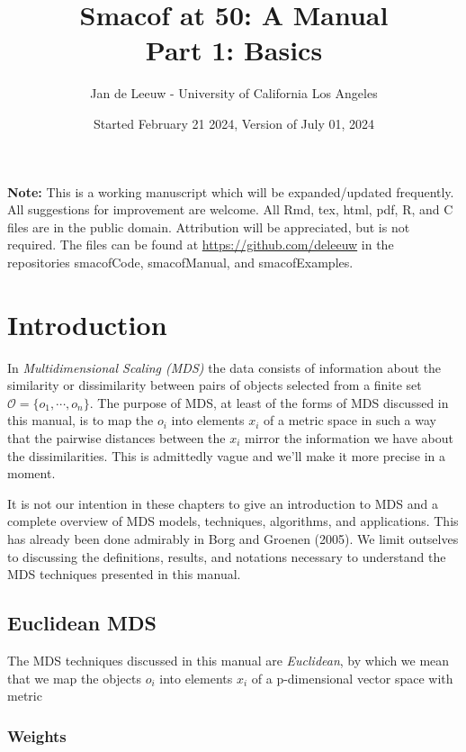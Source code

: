 \documentclass[
  12pt,
]{article}
\title{Smacof at 50: A Manual\\
Part 1: Basics}
\author{Jan de Leeuw - University of California Los Angeles}
\date{Started February 21 2024, Version of July 01, 2024}
\newcommand{\sectionbreak}{\clearpage}
\begin{document}
\maketitle

{
\setcounter{tocdepth}{4}
\tableofcontents
}
\textbf{Note:} This is a working manuscript which will be expanded/updated
frequently. All suggestions for improvement are welcome. All Rmd, tex,
html, pdf, R, and C files are in the public domain. Attribution will be
appreciated, but is not required. The files can be found at
\url{https://github.com/deleeuw} in the repositories smacofCode, smacofManual,
and smacofExamples.

\sectionbreak

\section{Introduction}\label{introduction}

In \emph{Multidimensional Scaling (MDS)} the data consists of information
about the similarity or dissimilarity between pairs of objects selected
from a finite set \(\mathcal{O}=\{o_1,\cdots,o_n\}\). The purpose of MDS,
at least of the forms of MDS discussed in this manual, is to map
the \(o_i\) into elements \(x_i\) of a metric space in such a way that
the pairwise distances between the \(x_i\) mirror the information we have about the dissimilarities. This is admittedly vague and we'll make it more
precise in a moment.

It is not our intention in these chapters to give an introduction to MDS
and a complete overview of MDS models, techniques, algorithms, and
applications. This has already been done admirably in
Borg and Groenen (2005). We limit outselves to discussing the definitions, results, and notations necessary to understand the MDS techniques presented in this manual.

\subsection{Euclidean MDS}\label{euclidean-mds}

The MDS techniques discussed in this manual are \emph{Euclidean}, by which we mean that we map the objects \(o_i\) into elements \(x_i\) of a p-dimensional vector space with metric

\subsubsection{Weights}\label{weights}
\end{document}
